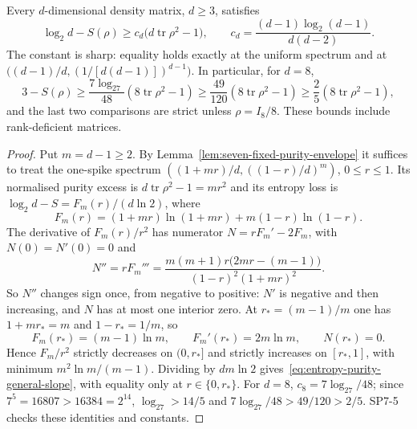 \begin{lemma}\label{lem:seven-entropy-linear-purity}
Every $d$-dimensional density matrix, $d\ge3$, satisfies
\begin{equation}\label{eq:entropy-purity-general-slope}
 \log_2d-S(\rho)\ge c_d\bigl(d\operatorname{tr}\rho^2-1\bigr),
 \qquad c_d=\frac{(d-1)\log_2(d-1)}{d(d-2)}.
\end{equation}
The constant is sharp: equality holds exactly at the uniform spectrum and at
$\bigl((d-1)/d,(1/[d(d-1)])^{d-1}\bigr)$. In particular, for $d=8$,
\begin{equation}\label{eq:seven-entropy-linear-purity}
 3-S(\rho)\ge\frac{7\log_27}{48}(8\operatorname{tr}\rho^2-1)
 \ge\frac{49}{120}(8\operatorname{tr}\rho^2-1)
 \ge\frac25(8\operatorname{tr}\rho^2-1),
\end{equation}
and the last two comparisons are strict unless $\rho=I_8/8$.
These bounds include rank-deficient matrices.
\end{lemma}
\begin{proof}
Put $m=d-1\ge2$. By Lemma~\ref{lem:seven-fixed-purity-envelope} it suffices to treat the one-spike spectrum
$((1+mr)/d,((1-r)/d)^m)$, $0\le r\le1$. Its normalised purity excess is $d\operatorname{tr}\rho^2-1=mr^2$ and its
entropy loss is $\log_2d-S=F_m(r)/(d\ln2)$, where
\[
 F_m(r)=(1+mr)\ln(1+mr)+m(1-r)\ln(1-r).
\]
The derivative of $F_m(r)/r^2$ has numerator $N=rF_m'-2F_m$, with $N(0)=N'(0)=0$ and
\[
 N''=rF_m'''=\frac{m(m+1)r\bigl(2mr-(m-1)\bigr)}{(1-r)^2(1+mr)^2}.
\]
So $N''$ changes sign once, from negative to positive: $N'$ is negative and then increasing, and $N$ has at most one
interior zero. At $r_*=(m-1)/m$ one has $1+mr_*=m$ and $1-r_*=1/m$, so
\[
 F_m(r_*)=(m-1)\ln m,\qquad F_m'(r_*)=2m\ln m,\qquad N(r_*)=0.
\]
Hence $F_m/r^2$ strictly decreases on $(0,r_*]$ and strictly increases on $[r_*,1]$, with minimum $m^2\ln m/(m-1)$.
Dividing by $dm\ln2$ gives~\eqref{eq:entropy-purity-general-slope}, with equality only at $r\in\{0,r_*\}$.
For $d=8$, $c_8=7\log_27/48$; since $7^5=16807>16384=2^{14}$, $\log_27>14/5$ and
$7\log_27/48>49/120>2/5$. SP7-5 checks these identities and constants.
\end{proof}


